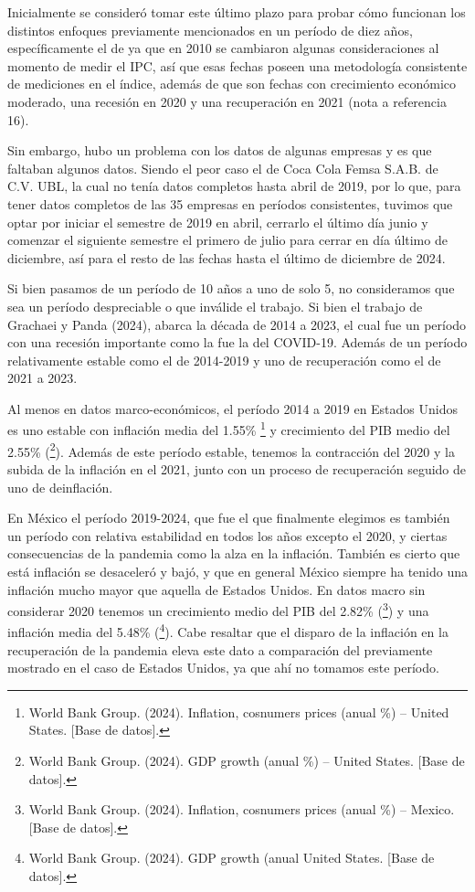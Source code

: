 \documentclass[
]{article}
\begin{document}
Inicialmente se consideró tomar este último plazo para probar cómo funcionan los
distintos enfoques previamente mencionados en un período de diez años,
específicamente el de ya que en 2010 se cambiaron algunas consideraciones al
momento de medir el IPC, así que esas fechas poseen una metodología consistente
de mediciones en el índice, además de que son fechas con crecimiento económico
moderado, una recesión en 2020 y una recuperación en 2021 (nota a referencia 16).

Sin embargo, hubo un problema con los datos de algunas empresas y es que
faltaban algunos datos. Siendo el peor caso el de Coca Cola Femsa S.A.B. de C.V.
UBL, la cual no tenía datos completos hasta abril de 2019, por lo que, para tener
datos completos de las 35 empresas en períodos consistentes, tuvimos que optar
por iniciar el semestre de 2019 en abril, cerrarlo el último día junio y comenzar el
siguiente semestre el primero de julio para cerrar en día último de diciembre, así
para el resto de las fechas hasta el último de diciembre de 2024.

Si bien pasamos de un período de 10 años a uno de solo 5, no consideramos que
sea un período despreciable o que inválide el trabajo. Si bien el trabajo de Grachaei
y Panda (2024), abarca la década de 2014 a 2023, el cual fue un período con una
recesión importante como la fue la del COVID-19. Además de un período 
relativamente estable como el de 2014-2019 y uno de recuperación como el de 2021
a 2023.

Al menos en datos marco-económicos, el período 2014 a 2019 en Estados Unidos
es uno estable con inflación media del 1.55\% \footnote{World Bank Group. (2024). Inflation,
cosnumers prices (anual \%) – United States. {[}Base de datos{]}.} y crecimiento del PIB medio del 
2.55\% (\footnote{World Bank Group. (2024). GDP growth (anual \%) – United States.
{[}Base de datos{]}.}). Además de este período estable, tenemos la contracción del 2020
y la subida de la inflación en el 2021, junto con un proceso de recuperación seguido
de uno de deinflación.

En México el período 2019-2024, que fue el que finalmente elegimos es también un
período con relativa estabilidad en todos los años excepto el 2020, y ciertas
consecuencias de la pandemia como la alza en la inflación. También es cierto que
está inflación se desaceleró y bajó, y que en general México siempre ha tenido una
inflación mucho mayor que aquella de Estados Unidos. En datos macro sin
considerar 2020 tenemos un crecimiento medio del PIB del 2.82\%
(\footnote{World Bank
Group. (2024). Inflation, cosnumers prices (anual \%) – Mexico. {[}Base de datos{]}.}) y 
una inflación media del 5.48\% (\footnote{World Bank Group. (2024). GDP growth (anual %
United States. {[}Base de datos{]}.}). Cabe resaltar que el disparo de la inflación en la
recuperación de la pandemia eleva este dato a comparación del previamente
mostrado en el caso de Estados Unidos, ya que ahí no tomamos este período.
\end{document}
